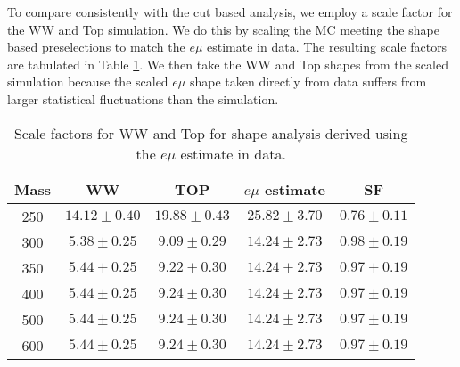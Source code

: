 
To compare consistently with the cut based analysis, we employ a scale factor
for the WW and Top simulation.  We do this by scaling the MC meeting the
shape based preselections to match the $e\mu$ estimate in data.
The resulting scale factors are tabulated in Table \ref{tab:shape_sf_emu}.
We then take the WW and Top shapes from the scaled simulation because the 
scaled $e\mu$ shape taken directly from data suffers from larger statistical
fluctuations than the simulation.

\begin{table}[!ht]
\begin{center}
\small{
\begin{tabular}{c|c|c|c|c}
Mass &   WW             & TOP              & $e\mu$ estimate   & SF \\ \hline
250  & $14.12 \pm 0.40$ & $19.88 \pm 0.43$ & $25.82 \pm 3.70$  & $0.76 \pm 0.11$ \\ \hline
300  & $5.38 \pm 0.25$  & $9.09 \pm 0.29$  & $14.24 \pm 2.73$  &  $0.98 \pm 0.19$ \\ \hline
350  & $5.44 \pm 0.25$  & $9.22 \pm 0.30$  & $14.24 \pm 2.73$  &  $0.97 \pm 0.19$ \\ \hline
400  & $5.44 \pm 0.25$  & $9.24 \pm 0.30$  & $14.24 \pm 2.73$  &  $0.97 \pm 0.19$ \\ \hline
500  & $5.44 \pm 0.25$  & $9.24 \pm 0.30$  & $14.24 \pm 2.73$  & $0.97 \pm 0.19$ \\ \hline
600  & $5.44 \pm 0.25$  & $9.24 \pm 0.30$  & $14.24 \pm 2.73$  & $0.97 \pm 0.19$ \\ \hline
\end{tabular}
\caption{Scale factors for WW and Top for shape analysis derived using the $e\mu$ estimate in data.}
\label{tab:shape_sf_emu}}
\end{center}
\end{table}


